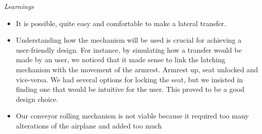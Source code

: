 \emph{Learnings}

\begin{itemize}
	\item It is possible, quite easy and comfortable to make a lateral transfer.
	\item Understanding how the mechanism will be used is crucial for achieving a user-friendly design. For instance, by simulating how a transfer would be made by an user, we noticed that it made sense to link the latching mechanism with the movement of the armrest. Armrest up, seat unlocked and vice-versa. We had several options for locking the seat, but we insisted in finding one that would be intuitive for the user. This proved to be a good design choice.
	\item Our conveyor rolling mechanism is not viable because it required too many alterations of the airplane and added too much 
\end{itemize}





